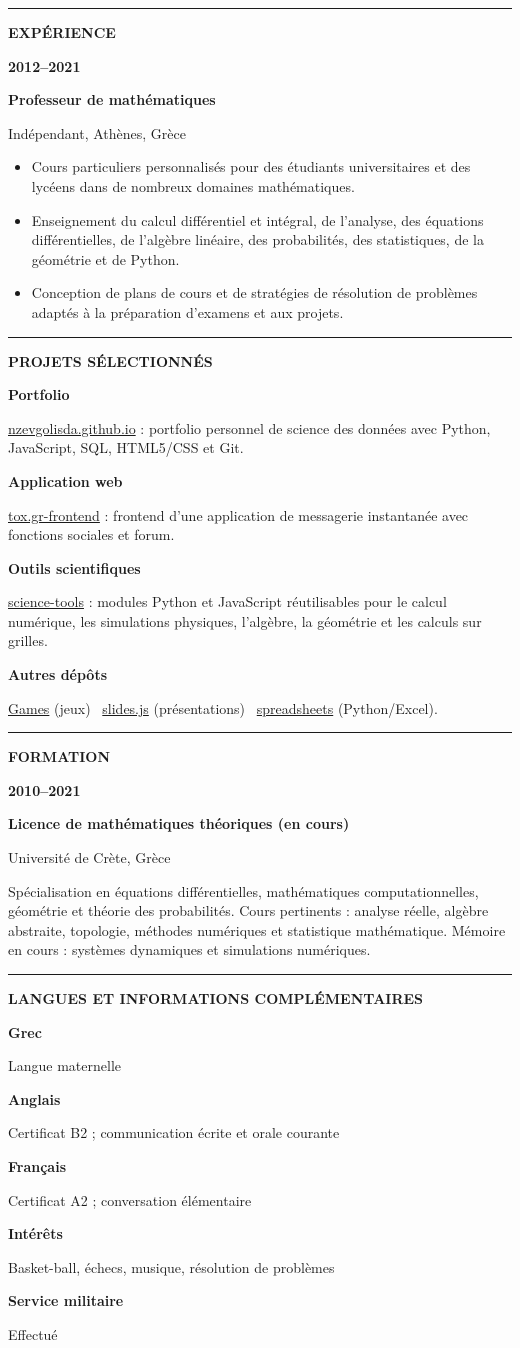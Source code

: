 \documentclass[10pt,a4paper]{article}
\newcommand{\sectiontitle}[1]{%
    \vspace{0.38em}%
    {\color{accent}\rule{0.08\textwidth}{1.4pt}}\hspace{0.55em}%
    {\small\bfseries\color{ink}\MakeUppercase{#1}}\par
    \vspace{0.18em}
}
\newcommand{\cvrow}[2]{%
    {\small\bfseries\color{accent}#1}\par
    {\small\color{ink}#2}\par\vspace{0.08em}
}
\newcommand{\entry}[4]{%
    {\small\bfseries\color{accent}#1}\par
    {\bfseries\color{ink}#2}\par
    {\small\color{muted}#3, #4}\par\vspace{0.08em}
}
\begin{document}
\sectiontitle{Expérience}
\entry{2012--2021}{Professeur de mathématiques}{Indépendant}{Athènes, Grèce}
\begin{itemize}
    \item Cours particuliers personnalisés pour des étudiants universitaires et des lycéens dans de nombreux domaines mathématiques.
    \item Enseignement du calcul différentiel et intégral, de l’analyse, des équations différentielles, de l’algèbre linéaire, des probabilités, des statistiques, de la géométrie et de Python.
    \item Conception de plans de cours et de stratégies de résolution de problèmes adaptés à la préparation d’examens et aux projets.
\end{itemize}

\sectiontitle{Projets sélectionnés}
\cvrow{Portfolio}{\href{https://nzevgolisda.github.io/}{nzevgolisda.github.io} : portfolio personnel de science des données avec Python, JavaScript, SQL, HTML5/CSS et Git.}
\cvrow{Application web}{\href{https://github.com/nzevgolisda/tox.gr-frontend}{tox.gr-frontend} : frontend d’une application de messagerie instantanée avec fonctions sociales et forum.}
\cvrow{Outils scientifiques}{\href{https://github.com/nzevgolisda/science-tools}{science-tools} : modules Python et JavaScript réutilisables pour le calcul numérique, les simulations physiques, l’algèbre, la géométrie et les calculs sur grilles.}
\cvrow{Autres dépôts}{\href{https://github.com/nzevgolisda/Games}{Games} (jeux) \textbullet\ \href{https://github.com/nzevgolisda/slides.js}{slides.js} (présentations) \textbullet\ \href{https://github.com/nzevgolisda/spreadsheets}{spreadsheets} (Python/Excel).}

\sectiontitle{Formation}
\entry{2010--2021}{Licence de mathématiques théoriques (en cours)}{Université de Crète}{Grèce}
Spécialisation en équations différentielles, mathématiques computationnelles, géométrie et théorie des probabilités. Cours pertinents : analyse réelle, algèbre abstraite, topologie, méthodes numériques et statistique mathématique. Mémoire en cours : systèmes dynamiques et simulations numériques.

\sectiontitle{Langues et informations complémentaires}
\cvrow{Grec}{Langue maternelle}
\cvrow{Anglais}{Certificat B2 ; communication écrite et orale courante}
\cvrow{Français}{Certificat A2 ; conversation élémentaire}
\cvrow{Intérêts}{Basket-ball, échecs, musique, résolution de problèmes}\vspace{0.1em}
\cvrow{Service militaire}{Effectué}
\end{document}
